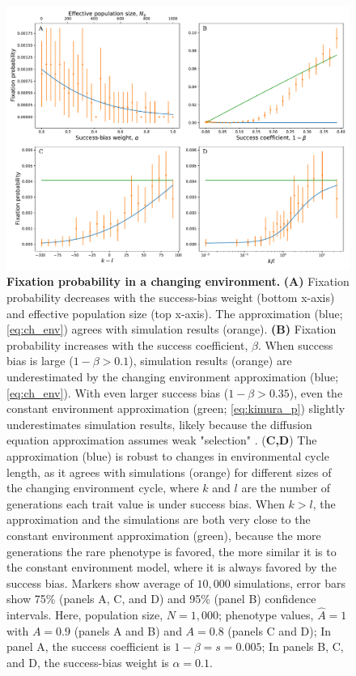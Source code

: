 \documentclass[12pt]{extarticle}
\begin{document}
\begin{figure}[H]
    \includegraphics[width=\linewidth]{ch_env.pdf}
  \caption{\textbf{Fixation probability in a changing environment.}
\textbf{(A)} Fixation probability decreases with {the} success-bias weight (bottom x-axis) and effective population size (top x-axis). The approximation (blue; \cref{eq:ch_env}) agrees with simulation results (orange). 
\textbf{(B)} Fixation probability increases with the success coefficient, $\beta$.
When success bias is large ($1-\beta > 0.1$),  
simulation results (orange) are underestimated by the changing environment approximation (blue; \cref{eq:ch_env}). With even larger success bias ($1-\beta > 0.35$), even the constant environment approximation (green; \cref{eq:kimura_p}) slightly underestimates simulation results, likely because the diffusion equation approximation assumes weak "selection" .
(\textbf{C,D}) The approximation (blue) is robust to changes in environmental cycle length, as it agrees with simulations (orange) for different sizes of the changing environment cycle, where $k$ and $l$ are the number of generations each trait value is under success bias. 
When $k>l$, the approximation and the simulations are both very close to the constant environment approximation (green), because the more generations the rare phenotype is favored, the more similar it is to the constant environment model, where it is always favored by the success bias.
Markers show average of $10,000$ simulations, error bars show 75\% (panels A, C, and D) and 95\% (panel B) confidence intervals.
  Here, population size, $N=1,000$; phenotype values, $\hat{A}=1$ with $A=0.9$ (panels A and B) and $A=0.8$ (panels C and D); In panel A, the success coefficient is $1-\beta=s=0.005$; In panels B, C, and D, the success-bias weight is $\alpha=0.1$.
  }
  \label{fig:ch_env_alpha_beta}
\end{figure}
\end{document}
